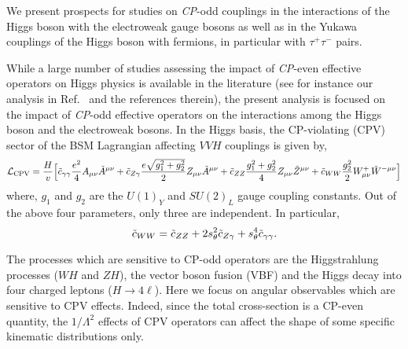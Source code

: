 %
 We present prospects for studies on {\it CP}-odd couplings in the
 interactions of the Higgs boson with the electroweak gauge bosons as well
 as in the Yukawa couplings of the Higgs boson with fermions, in
 particular with $\tau^+ \tau^-$ pairs.
 

While a large number of studies assessing the impact of {\it CP}-even  
effective operators on Higgs physics is available in the literature 
(see for instance our analysis in Ref.~\cite{Boselli:2017pef} and the references therein), 
the present analysis is focused on the impact of {\it CP}-odd effective operators on the 
interactions among the Higgs boson and the electroweak bosons. 
In the Higgs basis, the CP-violating (CPV) sector of the BSM Lagrangian affecting $VVH$ couplings 
is given by, 
% 
\begin{eqnarray}
\mathcal{L}_{\rm CPV} =  \frac{H}{v} \Big[
\tilde c_{\gamma\gamma} \frac{e^2}{4} A_{\mu\nu}\tilde{A}^{\mu\nu}  
+ \tilde c_{Z\gamma} \frac{e\sqrt{g_1^2 + g_2^2}}{2} Z_{\mu\nu}\tilde{A}^{\mu\nu} 
+ \tilde c_{ZZ} \frac{g_1^2 + g_2^2}{4} Z_{\mu\nu}\tilde{Z}^{\mu\nu} + \tilde{c}_{WW} \frac{g_2^2}{2}  W^+_{\mu\nu} \tilde W^{-\mu\nu}\Big]
\label{eqn:Hvv}
\end{eqnarray}  
where, $g_1$ and $g_2$ are the $U(1)_Y$  and  $SU(2)_L$ gauge coupling constants. Out of the above four 
parameters, only three  are independent. In particular,
\begin{equation}
 \tilde c_{WW} = \tilde c_{ZZ} + 2s_\theta^2 \tilde c_{Z\gamma} + s_\theta^4 \tilde c_{\gamma\gamma}.
\end{equation}

The processes which are sensitive to CP-odd operators are the Higgstrahlung processes ($WH$ and $ZH$), the vector boson fusion (VBF) and the Higgs decay into four charged leptons ($H\to4\ell$). Here we focus on angular observables which are sensitive to CPV effects. Indeed, since the total cross-section is a CP-even quantity,  the $1/\Lambda^2$ effects of CPV operators can affect the shape of some specific kinematic distributions only. 



